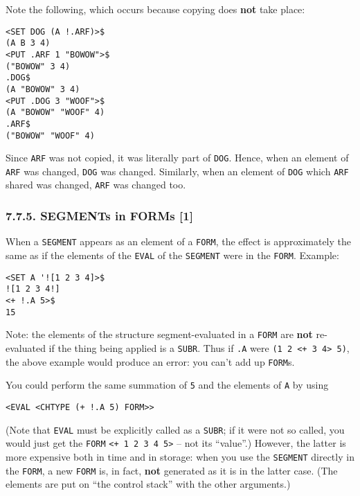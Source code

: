 \documentclass[a4paper,]{article}
\begin{document}
Note the following, which occurs because copying does \textbf{not} take place:

\begin{verbatim}
<SET DOG (A !.ARF)>$
(A B 3 4)
<PUT .ARF 1 "BOWOW">$
("BOWOW" 3 4)
.DOG$
(A "BOWOW" 3 4)
<PUT .DOG 3 "WOOF">$
(A "BOWOW" "WOOF" 4)
.ARF$
("BOWOW" "WOOF" 4)
\end{verbatim}

 Since \texttt{ARF} was not copied, it was literally part of \texttt{DOG}. Hence, when an element of
\texttt{ARF} was changed, \texttt{DOG} was changed. Similarly, when an element of \texttt{DOG} which \texttt{ARF} shared
was changed, \texttt{ARF} was changed too.

\subsubsection{7.7.5. SEGMENTs in FORMs {[}1{]}}\label{segments-in-forms-1}

When a \texttt{SEGMENT} appears as an element of a \texttt{FORM}, the effect is approximately the same as if the elements
of the \texttt{EVAL} of the \texttt{SEGMENT} were in the \texttt{FORM}. Example:

\begin{verbatim}
<SET A '![1 2 3 4]>$
![1 2 3 4!]
<+ !.A 5>$
15
\end{verbatim}

Note: the elements of the structure segment-evaluated in a \texttt{FORM} are \textbf{not} re-evaluated if the thing being
applied is a \texttt{SUBR}. Thus if \texttt{.A} were \texttt{(1\ 2\ \textless{}+\ 3\ 4\textgreater{}\ 5)}, the above
example would produce an error: you can't add up \texttt{FORM}s.

You could perform the same summation of \texttt{5} and the elements of \texttt{A} by using

\begin{verbatim}
<EVAL <CHTYPE (+ !.A 5) FORM>>
\end{verbatim}

(Note that \texttt{EVAL} must be explicitly called as a \texttt{SUBR}; if it were not so called, you would just get the
\texttt{FORM} \texttt{\textless{}+\ 1\ 2\ 3\ 4\ 5\textgreater{}} -- not its ``value''.) However, the latter is more
expensive both in time and in storage: when you use the \texttt{SEGMENT} directly in the \texttt{FORM}, a new \texttt{FORM}
is, in fact, \textbf{not} generated as it is in the latter case. (The elements are put on ``the control stack'' with the
other arguments.)
\end{document}
